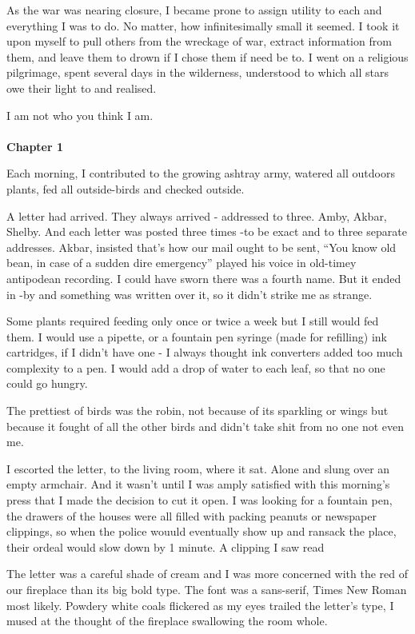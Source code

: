 \documentclass[12pt,openany]{book}
\begin{document}
As the war was nearing closure,
I became prone to assign utility to each
and everything I was to do. No matter,
how infinitesimally small it seemed.
I took it upon myself to pull others
from the wreckage of war, extract information
from them, and leave them to drown if I chose
them if need be
to. I went on a religious pilgrimage, spent
several days in the wilderness, understood
to which all stars owe their light to and
realised.

I am not who you think I am.\\\\

\textbf{Chapter 1}

Each morning, I contributed to the growing ashtray
army, watered all outdoors plants, fed all outside-birds
and checked outside.

A letter had arrived. They always arrived - addressed
to three. Amby, Akbar, Shelby. And each letter was posted
three times -to be exact and to three separate addresses.
Akbar, insisted that's how our mail
ought to be sent, ``You know old bean, in case of a sudden
dire emergency'' played his voice in
old-timey antipodean recording. I could have sworn
there was a fourth name. But it ended in
-by and something was written over it, so it
didn't strike me as strange.

Some plants required feeding only once or twice a week but I
still would fed them. I would use a pipette, or
a fountain pen syringe (made
for refilling) ink cartridges, if I didn't have one - I always
thought ink converters added too much
complexity to a pen. I would
add a drop of water to each leaf,
so that no one could go hungry.

The prettiest of birds was the
robin, not because of its
sparkling or wings but because
it fought of all the other birds
and didn't take shit from no one
not even me.


I escorted the letter, to the living
room, where it sat. Alone and slung
over an empty armchair. And it wasn't
until I was amply satisfied with
this morning's press that I made
the decision to cut it open. I was
looking for a fountain pen, the
drawers of the houses were all
filled with packing peanuts
or newspaper clippings,
so when the police wouuld
eventually show up
and ransack the place, their
ordeal would slow down by 1 minute.
A clipping I saw read

The letter was a careful shade
of cream and I was more concerned
with the red of our fireplace
than its big bold type.
The font was a sans-serif,
Times New Roman most likely.
Powdery
white coals flickered as my eyes
trailed the letter's type,
I mused at the thought of
the fireplace swallowing
the room whole.
\end{document}
